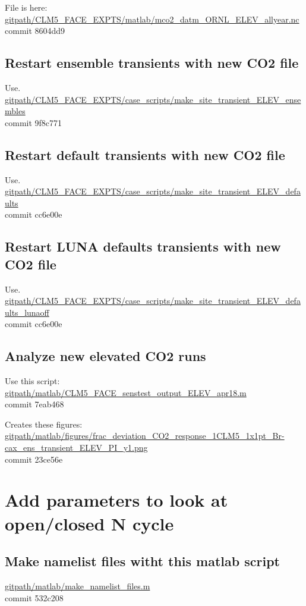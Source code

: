 \documentclass{article}
\begin{document}
File is here: 
{\color{red}\small{\url{gitpath/CLM5_FACE_EXPTS/matlab/mco2_datm_ORNL_ELEV_allyear.nc }} }\\
commit 8604dd9  

\subsection{Restart ensemble transients with new CO2 file}
Use.\\
{\color{blue}\small{\url{gitpath/CLM5_FACE_EXPTS/case_scripts/make_site_transient_ELEV_ensembles}}}\\
commit 9f8c771  

\subsection{Restart default transients with new CO2 file}
Use.\\
{\color{blue}\small{\url{gitpath/CLM5_FACE_EXPTS/case_scripts/make_site_transient_ELEV_defaults}}}\\
commit cc6e00e    

\subsection{Restart LUNA defaults transients with new CO2 file}
Use.\\
{\color{blue}\small{\url{gitpath/CLM5_FACE_EXPTS/case_scripts/make_site_transient_ELEV_defaults_lunaoff}}}\\
commit cc6e00e   

\subsection{Analyze new elevated CO2 runs}
Use this script:\\
{\color{blue}\small{\url{gitpath/matlab/CLM5_FACE_senstest_output_ELEV_apr18.m}}}\\
commit  7eab468  

Creates these figures:
{\color{magenta}\small{\url{gitpath/matlab/figures/frac_deviation_CO2_response_1CLM5_1x1pt_Br-cax_ens_transient_ELEV_PI_y1.png}}}\\
commit 23ce56e

\section{Add parameters to look at open/closed N cycle}
\subsection{Make namelist files witht this matlab script}
{\color{blue}\small{\url{gitpath/matlab/make_namelist_files.m}}}\\
commit 532c208  
\end{document}
